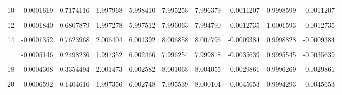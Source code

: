 \documentclass[a4paper]{tufte-handout}
\begin{document}
\begin{table}
{\begin{tabular}[t]{rrrrrrrrrr}
10 & -0.0001619 & 0.7174116 & 1.997968 & 5.998410 & 7.995258 & 7.996379 & -0.0011207 & 0.9998599 & -0.0011207\\
\addlinespace
\cellcolor{gray!6}{11} & \cellcolor{gray!6}{0.0003936} & \cellcolor{gray!6}{0.3787565} & \cellcolor{gray!6}{1.998269} & \cellcolor{gray!6}{5.998312} & \cellcolor{gray!6}{7.999307} & \cellcolor{gray!6}{7.996581} & \cellcolor{gray!6}{0.0027256} & \cellcolor{gray!6}{1.0003408} & \cellcolor{gray!6}{0.0027256}\\
12 & 0.0001840 & 0.6807879 & 1.997278 & 5.997512 & 7.996063 & 7.994790 & 0.0012735 & 1.0001593 & 0.0012735\\
\cellcolor{gray!6}{13} & \cellcolor{gray!6}{-0.0003081} & \cellcolor{gray!6}{0.4909276} & \cellcolor{gray!6}{2.007474} & \cellcolor{gray!6}{6.003329} & \cellcolor{gray!6}{8.008665} & \cellcolor{gray!6}{8.010804} & \cellcolor{gray!6}{-0.0021389} & \cellcolor{gray!6}{0.9997330} & \cellcolor{gray!6}{-0.0021389}\\
14 & -0.0001352 & 0.7623968 & 2.006404 & 6.001392 & 8.006858 & 8.007796 & -0.0009384 & 0.9998828 & -0.0009384\\
\cellcolor{gray!6}{15} & \cellcolor{gray!6}{0.0000724} & \cellcolor{gray!6}{0.8714218} & \cellcolor{gray!6}{2.001221} & \cellcolor{gray!6}{5.999281} & \cellcolor{gray!6}{8.001004} & \cellcolor{gray!6}{8.000502} & \cellcolor{gray!6}{0.0005016} & \cellcolor{gray!6}{1.0000627} & \cellcolor{gray!6}{0.0005016}\\
\addlinespace
16 & -0.0005146 & 0.2498236 & 1.997352 & 6.002466 & 7.996254 & 7.999818 & -0.0035639 & 0.9995545 & -0.0035639\\
\cellcolor{gray!6}{17} & \cellcolor{gray!6}{0.0002133} & \cellcolor{gray!6}{0.6333729} & \cellcolor{gray!6}{1.997627} & \cellcolor{gray!6}{6.003839} & \cellcolor{gray!6}{8.002944} & \cellcolor{gray!6}{8.001467} & \cellcolor{gray!6}{0.0014775} & \cellcolor{gray!6}{1.0001847} & \cellcolor{gray!6}{0.0014775}\\
18 & -0.0004308 & 0.3354494 & 2.001473 & 6.002582 & 8.001068 & 8.004055 & -0.0029861 & 0.9996269 & -0.0029861\\
\cellcolor{gray!6}{19} & \cellcolor{gray!6}{0.0002259} & \cellcolor{gray!6}{0.6134288} & \cellcolor{gray!6}{1.995501} & \cellcolor{gray!6}{5.998105} & \cellcolor{gray!6}{7.995169} & \cellcolor{gray!6}{7.993606} & \cellcolor{gray!6}{0.0015633} & \cellcolor{gray!6}{1.0001956} & \cellcolor{gray!6}{0.0015633}\\
20 & -0.0006592 & 0.1404616 & 1.997356 & 6.002748 & 7.995539 & 8.000104 & -0.0045653 & 0.9994293 & -0.0045653\\
\bottomrule
\end{tabular}}
\end{table}
\end{document}
